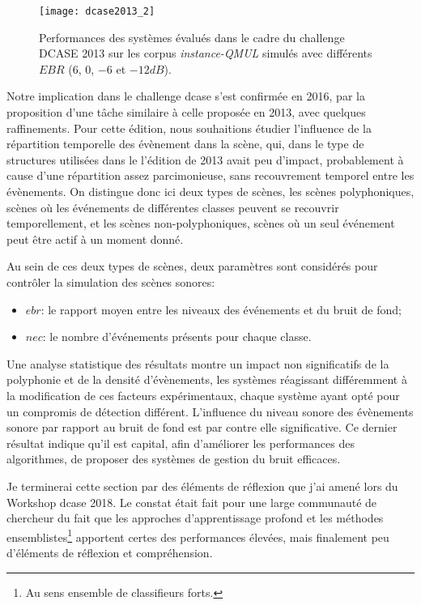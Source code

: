   \begin{figure}[t]
  \begin{center}
  \texttt{[image: dcase2013\_2]}
  \caption{Performances des systèmes évalués dans le cadre du challenge DCASE 2013 sur les corpus \emph{instance-QMUL} simulés avec différents $EBR$ ($6$, $0$, $-6$ et $-12dB$).}
  \label{fig:ebr}
  \end{center}
  \end{figure}

  Notre implication dans le challenge dcase s'est confirmée en 2016\cite{mesa}, par la proposition d'une tâche similaire à celle proposée en 2013, avec quelques raffinements. Pour cette édition, nous souhaitions étudier l'influence de la répartition temporelle des évènement dans la scène, qui, dans le type de structures utilisées dans le l'édition de 2013 avait peu d'impact, probablement à cause d'une répartition assez parcimonieuse, sans recouvrement temporel entre les évènements. On distingue donc ici deux types de scènes, les scènes polyphoniques, scènes où les événements de différentes classes peuvent se recouvrir temporellement, et les scènes non-polyphoniques, scènes où un seul événement peut être actif à un moment donné.

  Au sein de ces deux types de scènes, deux paramètres sont considérés pour contrôler la simulation des scènes sonores:
  \begin{itemize}
  \item $ebr$: le rapport moyen entre les niveaux des événements et du bruit de fond;
  \item $nec$: le nombre d'événements présents pour chaque classe.
  \end{itemize}

  Une analyse statistique des résultats\cite{lafayhal-01635414} montre un impact non significatifs de la polyphonie et de la densité d'évènements, les systèmes réagissant différemment à la modification de ces facteurs expérimentaux, chaque système ayant opté pour un compromis de détection différent. L'influence du niveau sonore des évènements sonore par rapport au bruit de fond est par contre elle significative. Ce dernier résultat indique qu'il est capital, afin d'améliorer les performances des algorithmes, de proposer des systèmes de gestion du bruit efficaces.

  Je terminerai cette section par des éléments de réflexion que j'ai amené lors du Workshop dcase 2018. Le constat était fait pour une large communauté de chercheur du fait que les approches d'apprentissage profond et les méthodes ensemblistes\footnote{Au sens ensemble de classifieurs forts.} apportent certes des performances élevées, mais finalement peu d'éléments de réflexion et compréhension.

